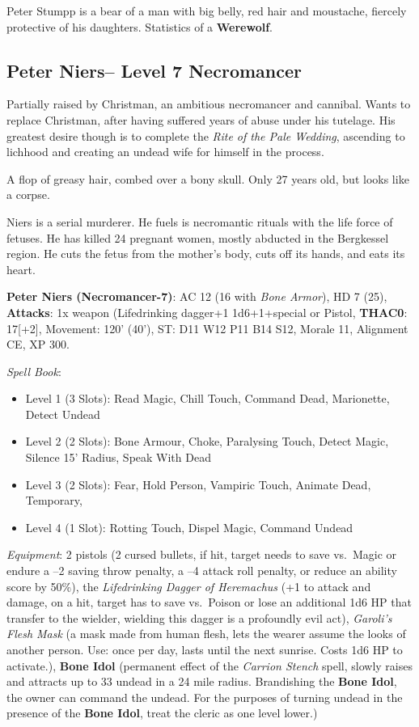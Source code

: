\documentclass[
]{book}
\begin{document}
Peter Stumpp is a bear of a man with big belly, red hair and moustache, fiercely protective of his daughters. Statistics of a \textbf{Werewolf}.

\subsection{Peter Niers-- Level 7 Necromancer}\label{peter-niers-level-7-necromancer}

Partially raised by Christman, an ambitious necromancer and cannibal. Wants to replace Christman, after having suffered years of abuse under his tutelage. His greatest desire though is to complete the \emph{Rite of the Pale Wedding}, ascending to lichhood and creating an undead wife for himself in the process.

A flop of greasy hair, combed over a bony skull. Only 27 years old, but looks like a corpse.

Niers is a serial murderer. He fuels is necromantic rituals with the life force of fetuses. He has killed 24 pregnant women, mostly abducted in the Bergkessel region. He cuts the fetus from the mother's body, cuts off its hands, and eats its heart.

\textbf{Peter Niers (Necromancer-7)}: AC 12 (16 with \emph{Bone Armor}), HD 7 (25), \textbf{Attacks}: 1x weapon (Lifedrinking dagger+1 1d6+1+special or Pistol, \textbf{THAC0}: 17{[}+2{]}, Movement: 120' (40'), ST: D11 W12 P11 B14 S12, Morale 11, Alignment CE, XP 300.

\emph{Spell Book}:

\begin{itemize}
\item
  Level 1 (3 Slots): Read Magic, Chill Touch, Command Dead, Marionette, Detect Undead
\item
  Level 2 (2 Slots): Bone Armour, Choke, Paralysing Touch, Detect Magic, Silence 15' Radius, Speak With Dead
\item
  Level 3 (2 Slots): Fear, Hold Person, Vampiric Touch, Animate Dead, Temporary,
\item
  Level 4 (1 Slot): Rotting Touch, Dispel Magic, Command Undead
\end{itemize}

\emph{Equipment}: 2 pistols (2 cursed bullets, if hit, target needs to save vs.~Magic or endure a --2 saving throw penalty, a --4 attack roll penalty, or reduce an ability score by 50\%), the \emph{Lifedrinking Dagger of Heremachus} (+1 to attack and damage, on a hit, target has to save vs.~Poison or lose an additional 1d6 HP that transfer to the wielder, wielding this dagger is a profoundly evil act), \emph{Garoli's Flesh Mask} (a mask made from human flesh, lets the wearer assume the looks of another person. Use: once per day, lasts until the next sunrise. Costs 1d6 HP to activate.), \textbf{Bone Idol} (permanent effect of the \emph{Carrion Stench} spell, slowly raises and attracts up to 33 undead in a 24 mile radius. Brandishing the \textbf{Bone Idol}, the owner can command the undead. For the purposes of turning undead in the presence of the \textbf{Bone Idol}, treat the cleric as one level lower.)
\end{document}
